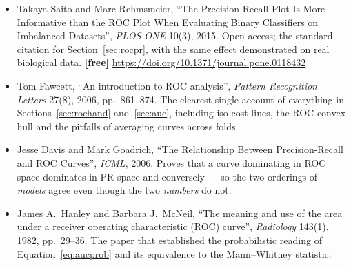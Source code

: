 \documentclass[11pt]{article}
\begin{document}
\begin{itemize}[leftmargin=*]
  \item Takaya Saito and Marc Rehmsmeier, ``The Precision-Recall Plot Is More
    Informative than the ROC Plot When Evaluating Binary Classifiers on
    Imbalanced Datasets'', \emph{PLOS ONE} 10(3), 2015. Open access; the
    standard citation for Section~\ref{sec:rocpr}, with the same effect
    demonstrated on real biological data. \textbf{[free]}
    \url{https://doi.org/10.1371/journal.pone.0118432}
  \item Tom Fawcett, ``An introduction to ROC analysis'', \emph{Pattern
    Recognition Letters} 27(8), 2006, pp.~861--874. The clearest single account
    of everything in Sections~\ref{sec:rochand} and~\ref{sec:auc}, including
    iso-cost lines, the ROC convex hull and the pitfalls of averaging curves
    across folds.
  \item Jesse Davis and Mark Goadrich, ``The Relationship Between
    Precision-Recall and ROC Curves'', \emph{ICML}, 2006. Proves that a curve
    dominating in ROC space dominates in PR space and conversely --- so the two
    orderings of \emph{models} agree even though the two \emph{numbers} do not.
  \item James A.\ Hanley and Barbara J.\ McNeil, ``The meaning and use of the
    area under a receiver operating characteristic (ROC) curve'',
    \emph{Radiology} 143(1), 1982, pp.~29--36. The paper that established the
    probabilistic reading of Equation~\eqref{eq:aucprob} and its equivalence to
    the Mann--Whitney statistic.
\end{itemize}

\enlargethispage{4\baselineskip}
\notesources{\AMLUnitVISources}
\end{document}
